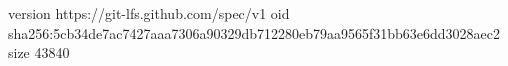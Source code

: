 version https://git-lfs.github.com/spec/v1
oid sha256:5cb34de7ac7427aaa7306a90329db712280eb79aa9565f31bb63e6dd3028aec2
size 43840
